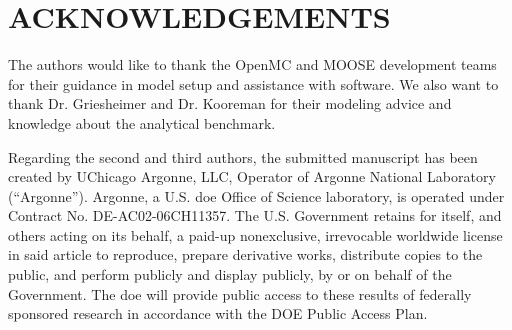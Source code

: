 \documentclass[letterpaper]{mc2023}
\begin{document}
\section*{ACKNOWLEDGEMENTS}
The authors would like to thank the OpenMC and MOOSE development teams for their guidance in model setup and assistance
with software. We also want to thank Dr. Griesheimer and Dr. Kooreman for their modeling advice and knowledge about the
analytical benchmark.

Regarding the second and third authors, the submitted manuscript has been created by UChicago Argonne, LLC, Operator of Argonne National Laboratory (“Argonne”).
Argonne, a U.S. \gls{doe} Office of Science laboratory, is operated under Contract No. DE-AC02-06CH11357. The U.S. Government retains for itself, and others
acting on its behalf, a paid-up nonexclusive, irrevocable worldwide license in said article to reproduce, prepare derivative works, distribute copies to the
public, and perform publicly and display publicly, by or on behalf of the Government. The \gls{doe} will provide public access to these results of federally
sponsored research in accordance with the DOE Public Access Plan.

\setlength{\baselineskip}{12pt}


\setlength{\baselineskip}{12pt}
\end{document}
